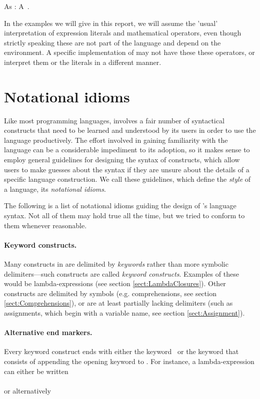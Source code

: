 \bgr
As : A~.
\egr

In the examples we will give in this report, we will assume the
'usual' interpretation of expression literals and mathematical
operators, even though strictly speaking these are not part of the
language and depend on the environment. A specific implementation of
\Cal may not have these these operators, or interpret them or the
literals in a different manner.


\section{Notational idioms}


Like most programming languages, \Cal involves a fair number of
syntactical constructs that need to be learned and understood by its
users in order to use the language productively. The effort involved
in gaining familiarity with the language can be a considerable
impediment to its adoption, so it makes sense to employ general
guidelines for designing the syntax of constructs, which allow users
to make guesses about the syntax if they are unsure about the details
of a specific language construction. We call these guidelines, which
define the {\em style} of a language, its {\em notational idioms}.

The following is a list of notational idioms guiding the design of
\Cal's language syntax. Not all of them may hold true all the
time, but we tried to conform to them whenever reasonable.


\paragraph{Keyword constructs.} Many constructs in \Cal are delimited
by {\em keywords} rather than more symbolic delimiters---such
constructs are called {\em keyword constructs}. Examples of these
would be lambda-expressions (see section
\ref{sect:LambdaClosures}). Other constructs are delimited by symbols
(e.g. comprehensions, see section \ref{sect:Comprehensions}), or are
at least partially lacking delimiters (such as assignments, which
begin with a variable name, see section \ref{sect:Assignment}).


\paragraph{Alternative end markers.} Every keyword construct ends
with either the keyword \kwEnd~or the keyword that consists of
appending the opening keyword to \kwEnd. For instance, a
lambda-expression can either be written\\
\\
or alternatively \\

